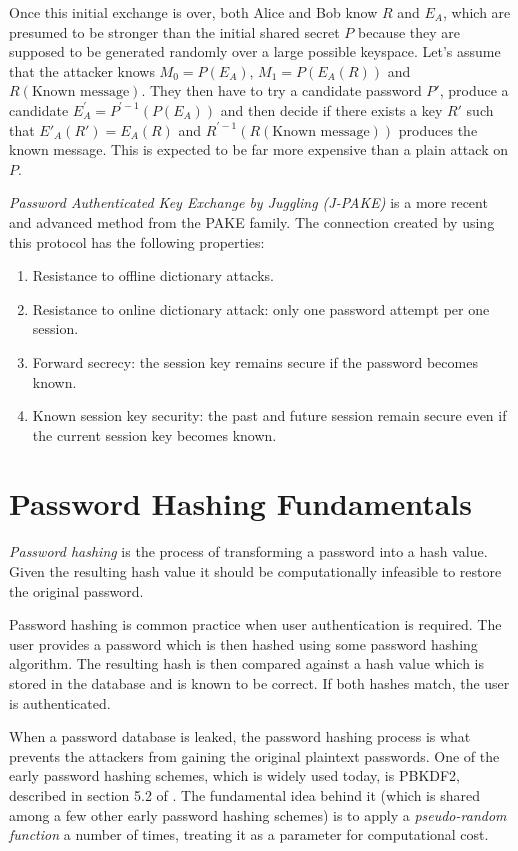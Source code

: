 Once this initial exchange is over, both Alice and Bob know \(R\) and \(E_A\), which are presumed to be stronger than the initial shared secret \(P\) because they are supposed to be generated randomly over a large possible keyspace. Let's assume that the attacker knows \(M_0 = P(E_A)\), \(M_1 = P(E_A(R))\) and \(R(\text{Known message})\). They then have to try a candidate password \(P'\), produce a candidate \(E_A^{'} = P^{'-1}(P(E_A))\) and then decide if there exists a key \(R'\) such that \(E'_A(R') = E_A(R)\) and \(R^{'-1}(R(\text{Known message}))\) produces the known message. This is expected to be far more expensive than a plain attack on \(P\).

\emph{Password Authenticated Key Exchange by Juggling (J-PAKE)} is a more recent and advanced method from the PAKE family. The connection created by using this protocol has the following properties:

\begin{enumerate}
    \item Resistance to offline dictionary attacks.
    \item Resistance to online dictionary attack: only one password attempt per one session.
    \item Forward secrecy: the session key remains secure if the password becomes known.
    \item Known session key security: the past and future session remain secure even if the current session key becomes known.
  \end{enumerate}

\section{Password Hashing Fundamentals}
\label{sec:fundamentals}

\emph{Password hashing} is the process of transforming a password into a hash value. Given the resulting hash value it should be computationally infeasible to restore the original password.

Password hashing is common practice when user authentication is required. The user provides a password which is then hashed using some password hashing algorithm. The resulting hash is then compared against a hash value which is stored in the database and is known to be correct. If both hashes match, the user is authenticated.

When a password database is leaked, the password hashing process is what prevents the attackers from gaining the original plaintext passwords. One of the early password hashing schemes, which is widely used today, is PBKDF2, described in section 5.2 of \cite{moriarty:2017:pkcs}. The fundamental idea behind it (which is shared among a few other early password hashing schemes) is to apply a \emph{pseudo-random function} a number of times, treating it as a parameter for computational cost.

